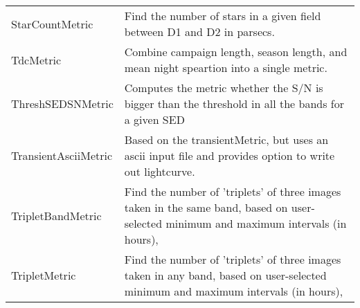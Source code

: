 \begin{table}
\begin{tabular}{ll}
 StarCountMetric &  Find the number of stars in a given field between D1 and D2 in parsecs. \\
 TdcMetric &  Combine campaign length, season length, and mean night speartion into a single metric. \\
 ThreshSEDSNMetric &  Computes the metric whether the S/N is bigger than the threshold in all the bands for a given SED \\
 TransientAsciiMetric &  Based on the transientMetric, but uses an ascii input file and provides option to write out lightcurve. \\
 TripletBandMetric &  Find the number of 'triplets' of three images taken in the same band, based on user-selected minimum and maximum intervals (in hours), \\
 TripletMetric &  Find the number of 'triplets' of three images taken in any band, based on user-selected minimum and maximum intervals (in hours), \\
\hline
\end{tabular}

 \end{table}
